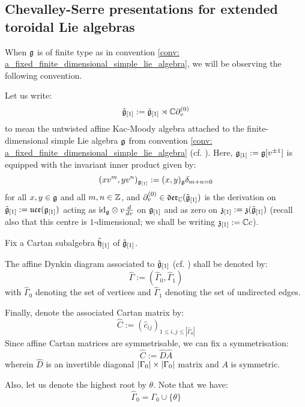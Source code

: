         \subsection{Chevalley-Serre presentations for extended toroidal Lie algebras}
            When $\mathfrak{g}$ is of finite type as in convention \ref{conv: a_fixed_finite_dimensional_simple_lie_algebra}, we will be observing the following convention.
            \begin{convention} \label{conv: a_fixed_untwisted_affine_kac_moody_algebra}
                Let us write:
                    $$\hat{\mathfrak{g}}_{[1]} := \tilde{\mathfrak{g}}_{[1]} \rtimes \mathbb{C} \partial_v^{(0)}$$
                to mean the untwisted affine Kac-Moody algebra attached to the finite-dimensional simple Lie algebra $\mathfrak{g}$ from convention \ref{conv: a_fixed_finite_dimensional_simple_lie_algebra} (cf. \cite[Chapter 7]{kac_infinite_dimensional_lie_algebras}). Here, $\mathfrak{g}_{[1]} := \mathfrak{g}[v^{\pm 1}]$ is equipped with the invariant inner product given by:
                    $$(x v^m, y v^n)_{\mathfrak{g}_{[1]}} := (x, y)_{\mathfrak{g}} \delta_{m + n = 0}$$
                for all $x, y \in \mathfrak{g}$ and all $m, n \in \mathbb{Z}$, and $\partial_v^{(0)} \in \mathfrak{der}_{\mathbb{C}}(\tilde{\mathfrak{g}}_{[1]})$ is the derivation on $\tilde{\mathfrak{g}}_{[1]} := \mathfrak{uce}(\mathfrak{g}_{[1]})$ acting as $\id_{\g} \tensor v \frac{d}{dv}$ on $\mathfrak{g}_{[1]}$ and as zero on $\mathfrak{z}_{[1]} := \mathfrak{z}(\tilde{\mathfrak{g}}_{[1]})$ (recall also that this centre is $1$-dimensional; we shall be writing $\mathfrak{z}_{[1]} := \mathbb{C} c$).
    
                Fix a Cartan subalgebra $\hat{\mathfrak{h}}_{[1]}$ of $\hat{\mathfrak{g}}_{[1]}$.
    
                The affine Dynkin diagram associated to $\hat{\mathfrak{g}}_{[1]}$ (cf. \cite[Chapter 4]{kac_infinite_dimensional_lie_algebras}) shall be denoted by:
                    $$\hat{\Gamma} := ( \hat{\Gamma}_0, \hat{\Gamma}_1 )$$
                with $\hat{\Gamma}_0$ denoting the set of vertices and $\hat{\Gamma}_1$ denoting the set of undirected edges.
    
                Finally, denote the associated Cartan matrix by:
                    $$\hat{C} := (\hat{c}_{ij})_{1 \leq i, j \leq |\hat{\Gamma}_0|}$$
                Since affine Cartan matrices are symmetrisable, we can fix a symmetrisation:
                    $$\hat{C} := \hat{D} \hat{A}$$
                wherein $\hat{D}$ is an invertible diagonal $|\Gamma_0| \x |\Gamma_0|$ matrix and $A$ is symmetric. 

                Also, let us denote the highest root by $\theta$. Note that we have:
                    $$\hat{\Gamma}_0 = \Gamma_0 \cup \{\theta\}$$
            \end{convention}
